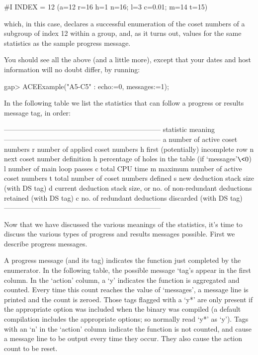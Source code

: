 \begintt
#I  INDEX = 12 (a=12 r=16 h=1 n=16; l=3 c=0.01; m=14 t=15)
\endtt

which, in this case, declares a successful enumeration  of  the  coset
numbers of a subgroup of index 12 within a group,  and,  as  it  turns
out, values for the same statistics as the sample progress message.

You should see all the above (and a little  more),  except  that  your
dates and host information will no doubt differ, by running:

\beginexample
gap> ACEExample("A5-C5" : echo:=0, messages:=1);
\endexample

In the following table we  list  the  statistics  that  can  follow  a
progress or results message tag, in order:

\begintt
--------------------------------------------------------------------
statistic   meaning
--------------------------------------------------------------------
a           number of active coset numbers
r           number of applied coset numbers
h           first (potentially) incomplete row
n           next coset number definition
h           percentage of holes in the table (if `messages'$ \< 0$) 
l           number of main loop passes
c           total CPU time
m           maximum number of active coset numbers
t           total number of coset numbers defined
s           new deduction stack size (with DS tag)
d           current deduction stack size, or
              no. of non-redundant deductions retained (with DS tag)
c           no. of redundant deductions discarded (with DS tag)
--------------------------------------------------------------------
\endtt

Now that we have discussed the various  meanings  of  the  statistics,
it's time to  discuss  the  various  types  of  progress  and  results
messages possible. First we describe progress messages.


A progress message (and its tag) indicates the function just completed
by the enumerator. In the following table, the possible message `tag's
appear in the first column. In the `action' column,  a  `y'  indicates
the function is aggregated and counted. Every time this count  reaches
the value of `messages', a message line is printed and  the  count  is
zeroed. Those tags flagged  with  a  `y*'  are  only  present  if  the
appropriate option was included when the {\ACE} binary was compiled (a
default compilation includes the appropriate options; so normally read
`y*' as `y'). Tags with an `n' in the  `action'  column  indicate  the
function is not counted, and cause a message line to be  output  every
time they occur. They also cause the action count to be reset.

